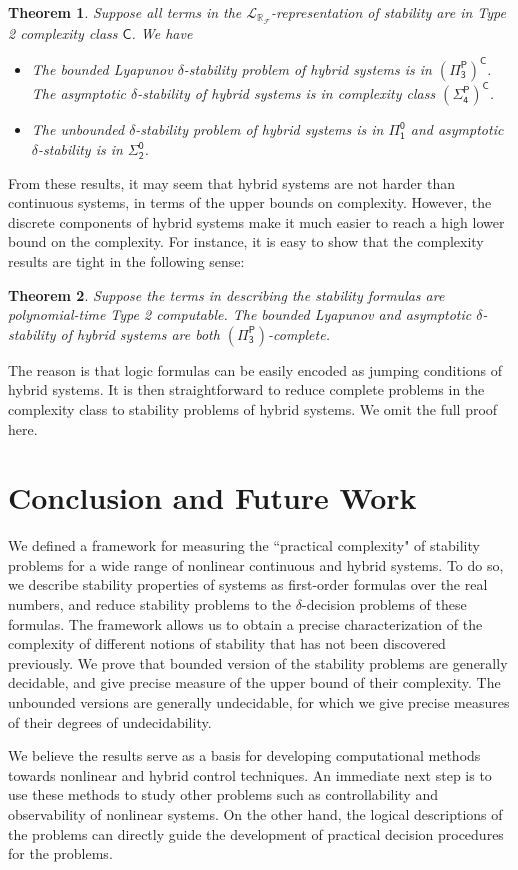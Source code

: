 \documentclass[10pt]{article}
\theoremstyle{plain}
\newtheorem{theorem}{Theorem}[section]
\theoremstyle{definition}
\newcommand{\lrf}{\mathcal{L}_{\mathbb{R}_{\mathcal{F}}}}
\begin{document}
\begin{theorem} Suppose all terms in the $\lrf$-representation of stability are in Type 2 complexity class $\mathsf{C}$. We have 
\begin{itemize}
\item The bounded Lyapunov $\delta$-stability problem of hybrid systems is in $\mathsf{(\Pi^P_3)^C}$. The asymptotic $\delta$-stability of hybrid systems is in complexity class $\mathsf{(\Sigma^P_4)^C}$. 
\item The unbounded $\delta$-stability problem of hybrid systems is in $\mathsf{\Pi_1^0}$ and asymptotic $\delta$-stability is in $\mathsf{\Sigma_2^0}$. 
\end{itemize}
\end{theorem}
From these results, it may seem that hybrid systems are not harder than continuous systems, in terms of the upper bounds on complexity. However, the discrete components of hybrid systems make it much easier to reach a high lower bound on the complexity. For instance, it is easy to show that the complexity results are tight in the following sense:
\begin{theorem}
Suppose the terms in describing the stability formulas are polynomial-time Type 2 computable. The bounded Lyapunov and asymptotic $\delta$-stability of hybrid systems are both $\mathsf{(\Pi^P_3)}$-complete. 
\end{theorem}
The reason is that logic formulas can be easily encoded as jumping conditions of hybrid systems. It is then straightforward to reduce complete problems in the complexity class to stability problems of hybrid systems. We omit the full proof here. 

\section{Conclusion and Future Work}
We defined a framework for measuring the ``practical complexity" of stability problems for a wide range of nonlinear continuous and hybrid systems. To do so, we describe stability properties of systems as first-order formulas over the real numbers, and reduce stability problems to the $\delta$-decision problems of these formulas. The framework allows us to obtain a precise characterization of the complexity of different notions of stability that has not been discovered previously. We prove that bounded version of the stability problems are generally decidable, and give precise measure of the upper bound of their complexity. The unbounded versions are generally undecidable, for which we give precise measures of their degrees of undecidability. 

We believe the results serve as a basis for developing computational methods towards nonlinear and hybrid control techniques. An immediate next step is to use these methods to study other problems such as controllability and observability of nonlinear systems. On the other hand, the logical descriptions of the problems can directly guide the development of practical decision procedures for the problems. 



\end{document}
